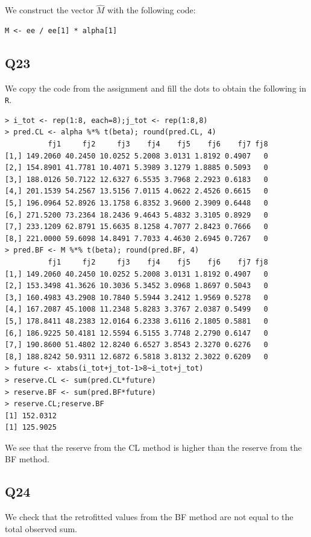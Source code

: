 \documentclass[11pt]{article}
\begin{document}
We construct the vector $\hat{M}$ with the following code:

\begin{verbatim}
M <- ee / ee[1] * alpha[1]
\end{verbatim}

\subsection*{Q23}

We copy the code from the assignment and fill the dots to obtain the following in \verb|R|.

\begin{verbatim}
> i_tot <- rep(1:8, each=8);j_tot <- rep(1:8,8)
> pred.CL <- alpha %*% t(beta); round(pred.CL, 4)
          fj1     fj2     fj3    fj4    fj5    fj6    fj7 fj8
[1,] 149.2060 40.2450 10.0252 5.2008 3.0131 1.8192 0.4907   0
[2,] 154.8901 41.7781 10.4071 5.3989 3.1279 1.8885 0.5093   0
[3,] 188.0126 50.7122 12.6327 6.5535 3.7968 2.2923 0.6183   0
[4,] 201.1539 54.2567 13.5156 7.0115 4.0622 2.4526 0.6615   0
[5,] 196.0964 52.8926 13.1758 6.8352 3.9600 2.3909 0.6448   0
[6,] 271.5200 73.2364 18.2436 9.4643 5.4832 3.3105 0.8929   0
[7,] 233.1209 62.8791 15.6635 8.1258 4.7077 2.8423 0.7666   0
[8,] 221.0000 59.6098 14.8491 7.7033 4.4630 2.6945 0.7267   0
> pred.BF <- M %*% t(beta); round(pred.BF, 4)
          fj1     fj2     fj3    fj4    fj5    fj6    fj7 fj8
[1,] 149.2060 40.2450 10.0252 5.2008 3.0131 1.8192 0.4907   0
[2,] 153.3498 41.3626 10.3036 5.3452 3.0968 1.8697 0.5043   0
[3,] 160.4983 43.2908 10.7840 5.5944 3.2412 1.9569 0.5278   0
[4,] 167.2087 45.1008 11.2348 5.8283 3.3767 2.0387 0.5499   0
[5,] 178.8411 48.2383 12.0164 6.2338 3.6116 2.1805 0.5881   0
[6,] 186.9225 50.4181 12.5594 6.5155 3.7748 2.2790 0.6147   0
[7,] 190.8600 51.4802 12.8240 6.6527 3.8543 2.3270 0.6276   0
[8,] 188.8242 50.9311 12.6872 6.5818 3.8132 2.3022 0.6209   0
> future <- xtabs(i_tot+j_tot-1>8~i_tot+j_tot)
> reserve.CL <- sum(pred.CL*future)
> reserve.BF <- sum(pred.BF*future)
> reserve.CL;reserve.BF
[1] 152.0312
[1] 125.9025
\end{verbatim}

We see that the reserve from the CL method is higher than the reserve from the BF method.

\subsection*{Q24}

We check that the retrofitted values from the BF method are not equal to the total observed sum.
\end{document}
